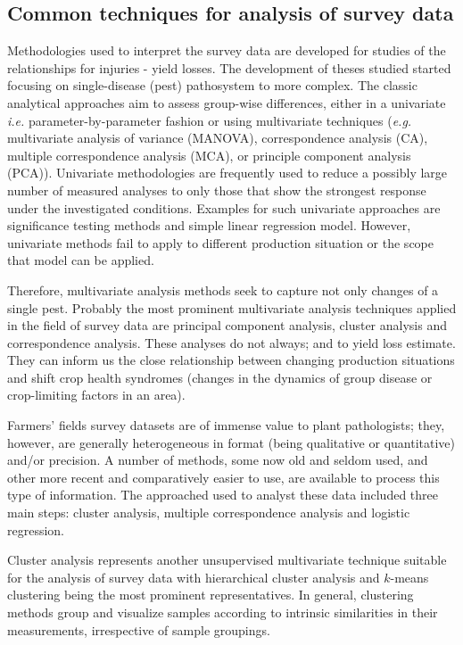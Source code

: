 \subsection*{Common techniques for analysis of survey data}

Methodologies used to interpret the survey data are developed for studies of the relationships for injuries - yield losses. The development of theses studied started focusing on single-disease (pest) pathosystem to more complex. The classic analytical approaches aim to assess group-wise differences, either in a univariate \textit{i.e.} parameter-by-parameter fashion or using multivariate techniques (\textit{e.g.} multivariate analysis of variance (MANOVA), correspondence analysis (CA), multiple correspondence analysis (MCA), or principle component analysis (PCA)). Univariate methodologies are frequently used to reduce a possibly large number of measured analyses to only those that show the strongest response under the investigated conditions. Examples for such univariate approaches are significance testing methods and simple linear regression model. However, univariate methods fail to apply to different production situation or the scope that model can be applied.


Therefore, multivariate analysis methods seek to capture not only changes of a single pest. Probably the most prominent multivariate analysis techniques applied in the field of survey data are principal component analysis, cluster analysis and correspondence analysis. These analyses do not always; and to yield loss estimate. They can inform us the close relationship between changing production situations and shift crop health syndromes (changes in the dynamics of group disease or crop-limiting factors in an area). 

Farmers' fields survey datasets are of immense value to plant pathologists; they, however, are generally heterogeneous in format (being qualitative or quantitative) and/or precision. A number of methods, some now old and seldom used, and other more recent and comparatively easier to use, are available to process this type of information. The approached used to analyst these data included three main steps: cluster analysis, multiple correspondence analysis and logistic regression.


Cluster analysis represents another unsupervised multivariate technique suitable for the analysis of survey data with hierarchical cluster analysis and $k$-means clustering being the most prominent representatives. In general, clustering methods group and visualize samples according to intrinsic similarities in their measurements, irrespective of sample groupings. 
